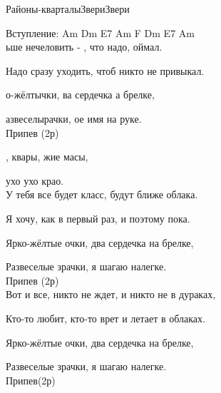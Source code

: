 \documentclass[11pt,a5paper]{book}
\renewcommand{\footrulewidth}{0.0pt}
\renewcommand{\footrulewidth}{0pt}
\renewcommand{\footrulewidth}{0.0pt}
\renewcommand{\tt}{\indent \indent}
\begin{document}
\begin{song}{Районы-кварталы}{}{Звери}{Звери}{}{}

Вступление: Am Dm E7 Am F Dm E7 Am\\

ьше нечеловить - , что надо, оймал.\par
Надо сразу уходить, чтоб никто не привыкал.\par
{}о-жёлтычки, ва сердечка а брелке,\par
{}азвеселырачки, ое имя на руке.\\

Припев (2р)\par
{}, квары, жие масы,\par
\tt{} ухо ухо крао.\\

У тебя все будет класс, будут ближе облака.\par
Я хочу, как в первый раз, и поэтому пока.\par
Ярко-жёлтые очки, два сердечка на брелке,\par
Развеселые зрачки, я шагаю налегке.\\

Припев (2р)\\

Вот и все, никто не ждет, и никто не в дураках,\par
Кто-то любит, кто-то врет и летает в облаках.\par
Ярко-жёлтые очки, два сердечка на брелке,\par
Развеселые зрачки, я шагаю налегке.\\

Припев(2р)\\
\end{song}

\mainmatter

\renewcommand{\footrulewidth}{0.0pt}
\renewcommand{\item}{\par\hangindent=40pt}
\renewcommand{\subitem}{\par\hangindent=40pt \hspace*{20pt}}
\renewcommand{\subsubitem}{\par\hangindent=40pt \hspace*{30pt}}

\newpage
\raggedright
\end{document}
